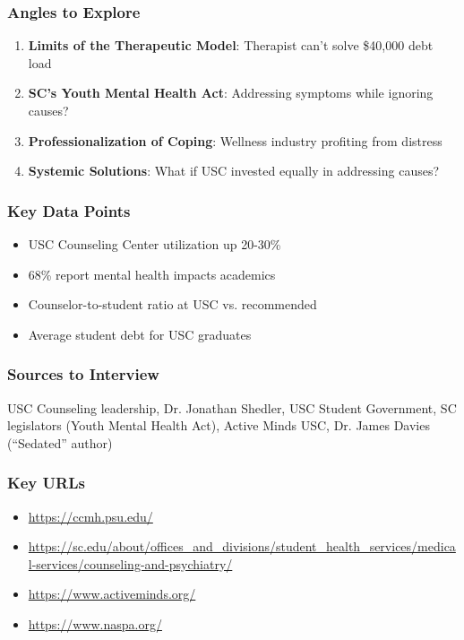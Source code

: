 \documentclass[11pt,letterpaper]{article}
\begin{document}
\subsubsection*{Angles to Explore}
\begin{enumerate}[noitemsep]
    \item \textbf{Limits of the Therapeutic Model}: Therapist can't solve \$40,000 debt load
    \item \textbf{SC's Youth Mental Health Act}: Addressing symptoms while ignoring causes?
    \item \textbf{Professionalization of Coping}: Wellness industry profiting from distress
    \item \textbf{Systemic Solutions}: What if USC invested equally in addressing causes?
\end{enumerate}

\subsubsection*{Key Data Points}
\begin{itemize}[noitemsep]
    \item USC Counseling Center utilization up 20-30\%
    \item 68\% report mental health impacts academics
    \item Counselor-to-student ratio at USC vs. recommended
    \item Average student debt for USC graduates
\end{itemize}

\subsubsection*{Sources to Interview}
USC Counseling leadership, Dr. Jonathan Shedler, USC Student Government, SC legislators (Youth Mental Health Act), Active Minds USC, Dr. James Davies (``Sedated'' author)

\subsubsection*{Key URLs}
\begin{itemize}[noitemsep]
    \item \url{https://ccmh.psu.edu/}
    \item \url{https://sc.edu/about/offices_and_divisions/student_health_services/medical-services/counseling-and-psychiatry/}
    \item \url{https://www.activeminds.org/}
    \item \url{https://www.naspa.org/}
\end{itemize}
\end{document}

